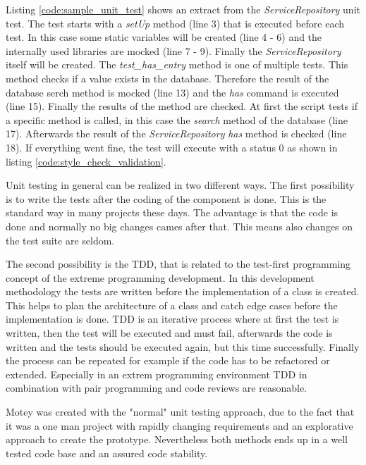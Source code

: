 Listing \ref{code:sample_unit_test} shows an extract from the \textit{ServiceRepository} unit test.
The test starts with a \textit{setUp} method (line 3) that is executed before each test.
In this case some static variables will be created (line 4 - 6) and the internally used libraries are mocked (line 7 - 9).
Finally the \textit{ServiceRepository} itself will be created.
The \textit{test\_has\_entry} method is one of multiple tests.
This method checks if a value exists in the database.
Therefore the result of the database serch method is mocked (line 13) and the \textit{has} command is executed (line 15).
Finally the results of the method are checked.
At first the script tests if a specific method is called, in this case the \textit{search} method of the database (line 17).
Afterwards the result of the \textit{ServiceRepository} \textit{has} method is checked (line 18).
If everything went fine, the test will execute with a status 0 as shown in listing \ref{code:style_check_validation}.

Unit testing in general can be realized in two different ways.
The first possibility is to write the tests after the coding of the component is done.
This is the standard way in many projects these days.
The advantage is that the code is done and normally no big changes cames after that.
This means also changes on the test suite are seldom.

The second possibility is the \ac{TDD}, that is related to the test-first programming concept of the extreme programming development.
In this development methodology the tests are written before the implementation of a class is created.
This helps to plan the architecture of a class and catch edge cases before the implementation is done.
\ac{TDD} is an iterative process where at first the test is written, then the test will be executed and must fail, afterwards the code is written and the tests should be executed again, but this time successfully.
Finally the process can be repeated for example if the code has to be refactored or extended.
Especially in an extrem programming environment \ac{TDD} in combination with pair programming and code reviews are reasonable.\newline

Motey was created with the "normal" unit testing approach, due to the fact that it was a one man project with rapidly changing requirements and an explorative approach to create the prototype.
Nevertheless both methods ends up in a well tested code base and an assured code stability.
